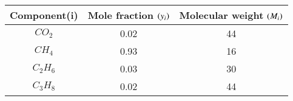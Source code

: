 \begin{tabular}[12pt]{|c|c|c|}
\hline
\textbf{Component(i)}&\textbf{Mole fraction $\left(y_i\right)$}&\textbf{Molecular weight $\left(M_i\right)$}\\
\hline
$CO_2$&0.02&44\\
\hline
$CH_4$&0.93&16\\
\hline
$C_2H_6$&0.03&30\\
\hline
$C_3H_8$&0.02&44\\
\hline
\end{tabular}